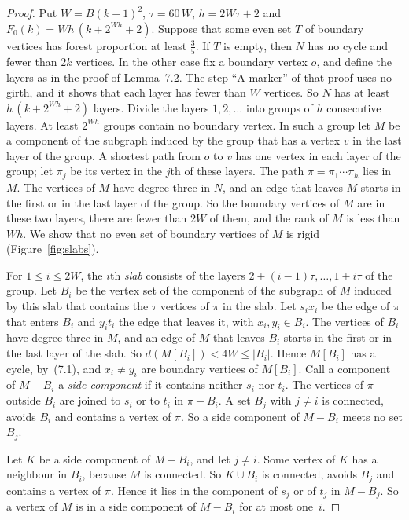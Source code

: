\begin{proof}
Put $W=B(k+1)^{2}$, $\tau=60\,W$, $h=2W\tau+2$ and $F_0(k)=Wh\,(k+2^{Wh}+2)$. Suppose that some
even set $T$ of boundary vertices has forest proportion at least $\frac35$. If $T$ is empty, then
$N$ has no cycle and fewer than $2k$ vertices. In the other case fix a boundary vertex $o$, and
define the layers as in the proof of Lemma~7.2. The step ``A marker'' of that proof
uses no girth, and it shows that each layer has fewer than $W$ vertices. So $N$ has at least
$h\,(k+2^{Wh}+2)$ layers. Divide the layers $1,2,\dots$ into groups of $h$ consecutive layers. At
least $2^{Wh}$ groups contain no boundary vertex. In such a group let $M$ be a component of the
subgraph induced by the group that has a vertex $v$ in the last layer of the group. A shortest
path from $o$ to $v$ has one vertex in each layer of the group; let $\pi_j$ be its vertex in the
$j$th of these layers. The path $\pi=\pi_1\cdots\pi_h$ lies in $M$. The vertices of $M$ have
degree three in $N$, and an edge that leaves $M$ starts in the first or in the last layer of the
group. So the boundary vertices of $M$ are in these two layers, there are fewer than $2W$ of
them, and the rank of $M$ is less than $Wh$. We show that no even set of boundary vertices of
$M$ is rigid (Figure~\ref{fig:slabs}).

 For $1\le i\le2W$, the $i$th \emph{slab} consists of the layers
$2+(i-1)\tau,\dots,1+i\tau$ of the group. Let $B_i$ be the vertex set of the component of the
subgraph of $M$ induced by this slab that contains the $\tau$ vertices of $\pi$ in the slab. Let
$s_ix_i$ be the edge of $\pi$ that enters $B_i$ and $y_it_i$ the edge that leaves it, with
$x_i,y_i\in B_i$. The vertices of $B_i$ have degree three in $M$, and an edge of $M$ that leaves
$B_i$ starts in the first or in the last layer of the slab. So $d(M[B_i])<4W\le|B_i|$. Hence
$M[B_i]$ has a cycle, by~(7.1), and $x_i\ne y_i$ are boundary vertices of
$M[B_i]$. Call a component of $M-B_i$ a \emph{side component} if it contains neither $s_i$ nor
$t_i$. The vertices of $\pi$ outside $B_i$ are joined to $s_i$ or to $t_i$ in $\pi-B_i$. A set
$B_j$ with $j\ne i$ is connected, avoids $B_i$ and contains a vertex of $\pi$. So a side
component of $M-B_i$ meets no set $B_j$.

 Let $K$ be a side component of $M-B_i$, and let $j\ne i$. Some
vertex of $K$ has a neighbour in $B_i$, because $M$ is connected. So $K\cup B_i$ is connected,
avoids $B_j$ and contains a vertex of $\pi$. Hence it lies in the component of $s_j$ or of
$t_j$ in $M-B_j$. So a vertex of $M$ is in a side component of $M-B_i$ for at most one~$i$.


\end{proof}
